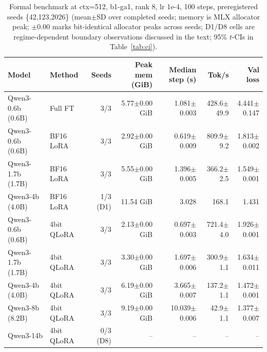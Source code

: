 \begin{table}[t]\centering
\caption{Formal benchmark at ctx=512, b1-ga1, rank 8, lr 1e-4, 100 steps, preregistered seeds \{42,123,2026\} (mean$\pm$SD over completed seeds; memory is MLX allocator peak; $\pm$0.00 marks bit-identical allocator peaks across seeds; D1/D8 cells are regime-dependent boundary observations discussed in the text; 95\% $t$-CIs in Table~\ref{tab:ci}).}
\label{tab:matrix}
\footnotesize\setlength{\tabcolsep}{4pt}
\begin{tabular}{llrrrrr}
\toprule
Model & Method & Seeds & Peak mem (GiB) & Median step (s) & Tok/s & Val loss\\
\midrule
Qwen3-0.6b (0.6B) & Full FT & 3/3 & 5.77$\pm$0.00 GiB & 1.081$\pm$0.003 & 428.6$\pm$49.9 & 4.441$\pm$0.147\\
Qwen3-0.6b (0.6B) & BF16 LoRA & 3/3 & 2.92$\pm$0.00 GiB & 0.619$\pm$0.009 & 809.9$\pm$9.2 & 1.813$\pm$0.002\\
Qwen3-1.7b (1.7B) & BF16 LoRA & 3/3 & 5.55$\pm$0.00 GiB & 1.396$\pm$0.005 & 366.2$\pm$2.5 & 1.549$\pm$0.001\\
Qwen3-4b (4.0B) & BF16 LoRA & 1/3 (D1) & 11.54 GiB & 3.028 & 168.1 & 1.431\\
Qwen3-0.6b (0.6B) & 4bit QLoRA & 3/3 & 2.13$\pm$0.00 GiB & 0.697$\pm$0.003 & 721.4$\pm$4.0 & 1.926$\pm$0.001\\
Qwen3-1.7b (1.7B) & 4bit QLoRA & 3/3 & 3.30$\pm$0.00 GiB & 1.697$\pm$0.006 & 300.9$\pm$1.1 & 1.634$\pm$0.011\\
Qwen3-4b (4.0B) & 4bit QLoRA & 3/3 & 6.19$\pm$0.00 GiB & 3.665$\pm$0.007 & 137.2$\pm$1.1 & 1.472$\pm$0.001\\
Qwen3-8b (8.2B) & 4bit QLoRA & 3/3 & 9.19$\pm$0.00 GiB & 10.039$\pm$0.006 & 42.9$\pm$1.1 & 1.377$\pm$0.007\\
Qwen3-14b & 4bit QLoRA & 0/3 (D8) & -- & -- & -- & --\\
\bottomrule
\end{tabular}
\end{table}
